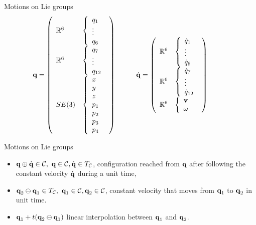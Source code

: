 \begin{frame} {Motions on Lie groups}
  $$\textbf{q}=
  \left(
  \begin{array}{ll}
    \mathbb{R}^6 &\left\{\begin{array}{l}q_1 \\ \vdots \\ q_6 \end{array}\right.\\
    \mathbb{R}^6 &\left\{\begin{array}{l} q_7 \\ \vdots \\ q_{12} \end{array}\right.\\
    SE(3)  &\left\{\begin{array}{l} x \\ y \\ z \\ p_1 \\ p_2 \\ p_3 \\ p_4\end{array}\right.
  \end{array}\right) \hspace*{1cm}
  \dot{\mathbf{q}}=
  \left(
  \begin{array}{ll}
    \mathbb{R}^6 &\left\{\begin{array}{l}\dot{q}_1 \\ \vdots \\ \dot{q}_6 \end{array}\right.\\
    \mathbb{R}^6 &\left\{\begin{array}{l} \dot{q}_7 \\ \vdots \\ \dot{q}_{12} \end{array}\right.\\
    \mathbb{R}^6 &\left\{\begin{array}{l} \mathbf{v}\\ \omega \end{array}\right.
  \end{array}\right) \hspace*{1cm}
  $$
\end{frame}

\begin{frame} {Motions on Lie groups}
  \begin{itemize}
  \item $\textbf{q}\oplus\dot{\mathbf{q}}\in{\cal C},\ \textbf{q}\in{\cal C}, \dot{\mathbf{q}}\in T_{\cal C}$, configuration reached from $\textbf{q}$ after following the constant velocity $\dot{\mathbf{q}}$ during a unit time,
  \item $\conf_2\ominus\conf_1\in\TCS,\ \conf_1\in\CS, \conf_2\in\CS$, constant velocity that moves from $\textbf{q}_1$ to $\textbf{q}_2$ in unit time.
  \item $\textbf{q}_1 + t (\textbf{q}_2\ominus\textbf{q}_1)$ linear interpolation between $\textbf{q}_1$ and $\textbf{q}_2$.
  \end{itemize}
\end{frame}

